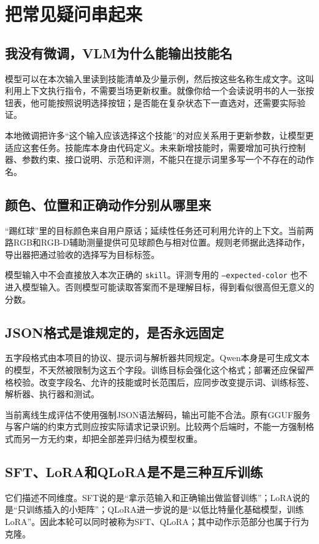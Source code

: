\chapter{把常见疑问串起来}
\section{我没有微调，VLM为什么能输出技能名}
模型可以在本次输入里读到技能清单及少量示例，然后按这些名称生成文字。这叫利用上下文执行指令，不需要当场更新权重。就像你给一个会读说明书的人一张按钮表，他可能按照说明选择按钮；是否能在复杂状态下一直选对，还需要实际验证。

本地微调把许多“这个输入应该选择这个技能”的对应关系用于更新参数，让模型更适应这套任务。技能库本身由代码定义。未来新增技能时，需要增加可执行控制器、参数约束、接口说明、示范和评测，不能只在提示词里多写一个不存在的动作名。

\section{颜色、位置和正确动作分别从哪里来}
“踢红球”里的目标颜色来自用户原话；延续性任务还可利用允许的上下文。当前两路RGB和RGB-D辅助测量提供可见球颜色与相对位置。规则老师据此选择动作，导出器把通过验收的选择写为目标标签。

模型输入中不会直接放入本次正确的 \texttt{skill}。评测专用的 \texttt{--expected-color} 也不进入模型输入。否则模型可能读取答案而不是理解目标，得到看似很高但无意义的分数。

\section{JSON格式是谁规定的，是否永远固定}
五字段格式由本项目的协议、提示词与解析器共同规定。Qwen本身是可生成文本的模型，不天然被限制为这五个字段。训练目标会强化这个格式；部署还应保留严格校验。改变字段名、允许的技能或时长范围后，应同步改变提示词、训练标签、解析器、执行器和测试。

当前离线生成评估不使用强制JSON语法解码，输出可能不合法。原有GGUF服务与客户端的约束方式则应按实际请求记录识别。比较两个后端时，不能一方强制格式而另一方无约束，却把全部差异归结为模型权重。

\section{SFT、LoRA和QLoRA是不是三种互斥训练}
它们描述不同维度。SFT说的是“拿示范输入和正确输出做监督训练”；LoRA说的是“只训练插入的小矩阵”；QLoRA进一步说的是“以低比特量化基础模型，训练LoRA”。因此本轮可以同时被称为SFT、QLoRA；其中动作示范部分也属于行为克隆。

